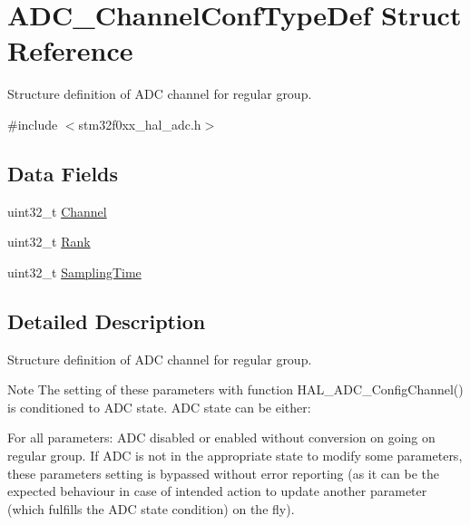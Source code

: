 \hypertarget{struct_a_d_c___channel_conf_type_def}{}\section{A\+D\+C\+\_\+\+Channel\+Conf\+Type\+Def Struct Reference}
\label{struct_a_d_c___channel_conf_type_def}


Structure definition of A\+DC channel for regular group.  




{\ttfamily \#include $<$stm32f0xx\+\_\+hal\+\_\+adc.\+h$>$}

\subsection*{Data Fields}
\begin{DoxyCompactItemize}
\item 
uint32\+\_\+t \hyperlink{struct_a_d_c___channel_conf_type_def_ae82bf9242a014164f9f6907f29782c44}{Channel}
\item 
uint32\+\_\+t \hyperlink{struct_a_d_c___channel_conf_type_def_ab926cc2abe3d17aeaf637d499aef6b1b}{Rank}
\item 
uint32\+\_\+t \hyperlink{struct_a_d_c___channel_conf_type_def_a72e649848c8a14f0adcba783cfb3b2cd}{Sampling\+Time}
\end{DoxyCompactItemize}


\subsection{Detailed Description}
Structure definition of A\+DC channel for regular group. 

\begin{DoxyNote}{Note}
The setting of these parameters with function H\+A\+L\+\_\+\+A\+D\+C\+\_\+\+Config\+Channel() is conditioned to A\+DC state. A\+DC state can be either\+:
\begin{DoxyItemize}
\item For all parameters\+: A\+DC disabled or enabled without conversion on going on regular group. If A\+DC is not in the appropriate state to modify some parameters, these parameters setting is bypassed without error reporting (as it can be the expected behaviour in case of intended action to update another parameter (which fulfills the A\+DC state condition) on the fly). 
\end{DoxyItemize}
\end{DoxyNote}


